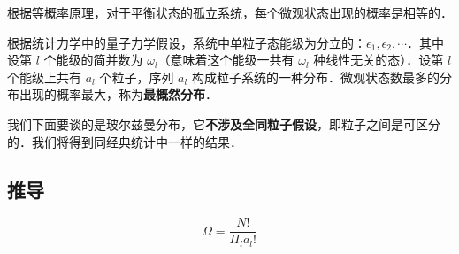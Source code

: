 

根据等概率原理，对于平衡状态的孤立系统，每个微观状态出现的概率是相等的．

根据统计力学中的量子力学假设，系统中单粒子态能级为分立的：$\epsilon_1,\epsilon_2,\cdots$．其中设第 $l$ 个能级的简并数为 $\omega_l$（意味着这个能级一共有 $\omega_l$ 种线性无关的态）．设第 $l$ 个能级上共有 $a_l$ 个粒子，序列 ${a_l}$ 构成粒子系统的一种分布．微观状态数最多的分布出现的概率最大，称为\textbf{最概然分布}．

我们下面要谈的是玻尔兹曼分布，它\textbf{不涉及全同粒子假设}，即粒子之间是可区分的．我们将得到同经典统计中一样的结果．

\subsection{推导}
\begin{equation}
\Omega=\frac{N!}{\Pi_l a_l!}
\end{equation}